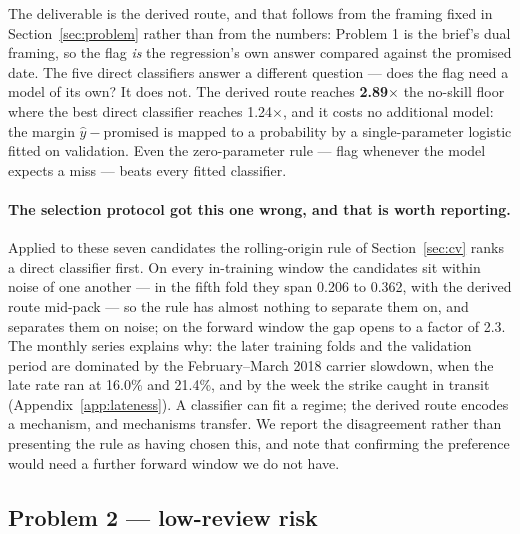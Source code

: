 The deliverable is the derived route, and that follows from the framing fixed in
Section~\ref{sec:problem} rather than from the numbers: Problem 1 is the brief's
dual framing, so the flag \emph{is} the regression's own answer compared against
the promised date. The five direct classifiers answer a different question ---
does the flag need a model of its own? It does not. The derived route reaches
\textbf{2.89$\times$} the no-skill floor where the best direct classifier reaches
1.24$\times$, and it costs no additional model: the margin
$\hat{y} - \text{promised}$ is mapped to a probability by a single-parameter
logistic \citep{platt1999probabilistic} fitted on validation. Even the
zero-parameter rule --- flag whenever the model expects a miss --- beats every
fitted classifier.

\paragraph{The selection protocol got this one wrong, and that is worth reporting.}
Applied to these seven candidates the rolling-origin rule of Section~\ref{sec:cv}
ranks a direct classifier first. On every in-training window the candidates sit
within noise of one another --- in the fifth fold they span 0.206 to 0.362, with
the derived route mid-pack --- so the rule has almost nothing to separate them
on, and separates them on noise; on the forward window the gap opens to a factor
of 2.3. The monthly series explains why: the later training folds and the
validation period are dominated by the February--March 2018 carrier slowdown,
when the late rate ran at 16.0\% and 21.4\%, and by the week the strike caught
in transit (Appendix~\ref{app:lateness}). A classifier can fit a regime; the
derived route encodes a mechanism, and mechanisms transfer. We report
the disagreement rather than presenting the rule as having chosen this, and note
that confirming the preference would need a further forward window we do not
have.

\subsection{Problem 2 --- low-review risk}
\label{sec:results-review}

